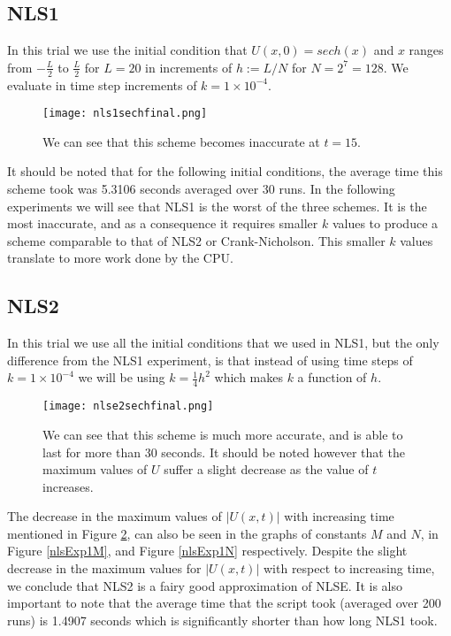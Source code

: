 \documentclass[11pt, oneside]{article}   	%
\begin{document}
\subsection{NLS1}
In this trial we use the initial condition that $U(x,0) = sech(x)$ and $x$ ranges from $-\frac{L}{2}$ to $\frac{L}{2}$ for $L= 20$ in increments of $h := L/N$ for $N = 2^7 = 128$. We evaluate in time step increments of $k = 1 \times 10^{-4}$.

\begin{figure}[H]
    \centering
    \texttt{[image: nls1sechfinal.png]}
    \caption{We can see that this scheme becomes inaccurate at $t = 15$.}
    \label{fig:my_label}
\end{figure}

It should be noted that for the following initial conditions, the average time this scheme took was 5.3106 seconds averaged over 30 runs. In the following experiments we will see that NLS1 is the worst of the three schemes. It is the most inaccurate, and as a consequence it requires smaller $k$ values to produce a scheme comparable to that of NLS2 or Crank-Nicholson. This smaller $k$ values translate to more work done by the CPU.

\subsection{NLS2}
In this trial we use all the initial conditions that we used in NLS1, but the only difference from the NLS1 experiment, is that instead of using time steps of $k = 1 \times 10^{-4}$ we will be using $k = \frac{1}{4}h^2$ which makes $k$ a function of $h$.
\begin{figure}[H]
    \centering
    \texttt{[image: nlse2sechfinal.png]}
    \caption{We can see that this scheme is much more accurate, and is able to last for more than 30 seconds. It should be noted however that the maximum values of $U$ suffer a slight decrease as the value of $t$ increases.}
    \label{fig:nls2sech}
\end{figure}

The decrease in the maximum values of $|U(x,t)|$ with increasing time mentioned in Figure \ref{fig:nls2sech}, can also be seen in the graphs of constants $M$ and $N$, in Figure \ref{nlsExp1M}, and Figure \ref{nlsExp1N} respectively. Despite the slight decrease in the maximum values for $|U(x,t)|$ with respect to increasing time, we conclude that NLS2 is a fairy good approximation of NLSE. It is also important to note that the average time that the script took (averaged over 200 runs) is 1.4907 seconds which is significantly shorter than how long NLS1 took.
\end{document}
